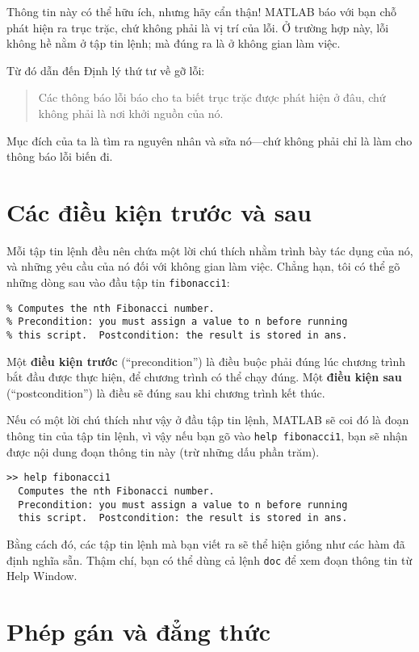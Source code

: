 \documentclass[12pt]{book}
\begin{document}
Thông tin này có thể hữu ích, nhưng hãy cẩn thận! MATLAB báo với
bạn chỗ phát hiện ra trục trặc, chứ không phải là vị trí của lỗi. Ở
trường hợp này, lỗi không hề nằm ở tập tin lệnh; mà đúng ra là ở
không gian làm việc.

Từ đó dẫn đến Định lý thứ tư về gỡ lỗi:

\begin{quote}
Các thông báo lỗi báo cho ta biết trục trặc được phát hiện ở đâu, chứ
không phải là nơi khởi nguồn của nó.
\end{quote}

Mục đích của ta là tìm ra nguyên nhân và sửa nó---chứ không phải 
chỉ là làm cho thông báo lỗi biến đi.


\section{Các điều kiện trước và sau}

Mỗi tập tin lệnh đều nên chứa một lời chú thích nhằm trình bày 
tác dụng của nó, và những yêu cầu của nó đối với không gian 
làm việc. Chẳng hạn, tôi có thể gõ những dòng sau vào đầu
tập tin {\tt fibonacci1}:

\begin{verbatim}
% Computes the nth Fibonacci number.  
% Precondition: you must assign a value to n before running 
% this script.  Postcondition: the result is stored in ans.
\end{verbatim}
%
Một {\bf điều kiện trước} (``precondition'') là điều buộc phải đúng
lúc chương trình bắt đầu được thực hiện, để chương trình có thể chạy đúng.
Một {\bf điều kiện sau} (``postcondition'') là điều sẽ đúng sau khi
chương trình kết thúc.

Nếu có một lời chú thích như vậy ở đầu tập tin lệnh, MATLAB sẽ 
coi đó là đoạn thông tin của tập tin lệnh, vì vậy nếu bạn gõ vào 
{\tt help fibonacci1}, bạn sẽ nhận được nội dung đoạn thông tin này
(trừ những dấu phần trăm).

\begin{verbatim}
>> help fibonacci1
  Computes the nth Fibonacci number.  
  Precondition: you must assign a value to n before running 
  this script.  Postcondition: the result is stored in ans.
\end{verbatim}

Bằng cách đó, các tập tin lệnh mà bạn viết ra sẽ thể hiện giống như
các hàm đã định nghĩa sẵn. Thậm chí, bạn có thể dùng cả lệnh
{\tt doc} để xem đoạn thông tin từ Help Window.


\section{Phép gán và đẳng thức}
\end{document}
